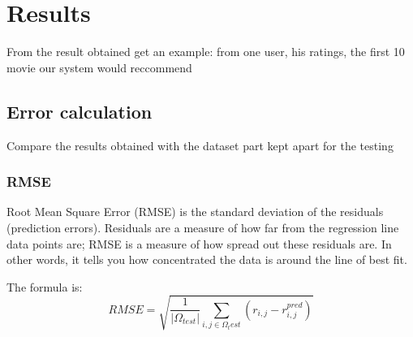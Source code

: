 \documentclass{article}
\begin{document}
\newpage

\section{Results}
From the result obtained get an example: from one user, his ratings, the first 10 movie our system would reccommend

\subsection{Error calculation}
Compare the results obtained with the dataset part kept apart for the testing

\subsubsection{RMSE}

Root Mean Square Error (RMSE) is the standard deviation of the residuals (prediction errors). Residuals are a measure of how far from the regression line data points are; RMSE is a measure of how spread out these residuals are. In other words, it tells you how concentrated the data is around the line of best fit. 

The formula is:
\begin{equation}
      RMSE = \sqrt{\frac{1}{|\Omega_{test}|}\sum_{i,j\in\Omega_test} (r_{i,j} - r_{i,j}^{pred})}
\end{equation}
\end{document}
